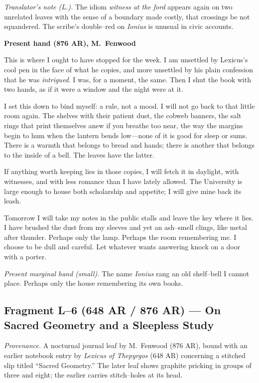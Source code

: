 \documentclass[11pt]{article}
\begin{document}
\medskip
\noindent\textit{Translator’s note (L.).} The idiom \textit{witness at the ford} appears again on two unrelated leaves with the sense of a boundary made costly, that crossings be not squandered. The scribe’s double–red on \emph{Ionius} is unusual in civic accounts.

\medskip
\noindent\textbf{Present hand (876 AR), M.\ Fenwood}

This is where I ought to have stopped for the week. I am unsettled by Lexicus’s cool pen in the face of what he copies, and more unsettled by his plain confession that he was \emph{intrigued}. I was, for a moment, the same. Then I shut the book with two hands, as if it were a window and the night were at it.

I set this down to bind myself: a rule, not a mood. I will not go back to that little room again. The shelves with their patient dust, the cobweb banners, the salt rings that print themselves anew if you breathe too near, the way the margins begin to hum when the lantern bends low—none of it is good for sleep or sums. There is a warmth that belongs to bread and hands; there is another that belongs to the inside of a bell. The leaves have the latter.

If anything worth keeping lies in those copies, I will fetch it in daylight, with witnesses, and with less romance than I have lately allowed. The University is large enough to house both scholarship and appetite; I will give mine back its leash.

Tomorrow I will take my notes in the public stalls and leave the key where it lies. I have brushed the dust from my sleeves and yet an ash–smell clings, like metal after thunder. Perhaps only the lamp. Perhaps the room remembering me. I choose to be dull and careful. Let whatever wants answering knock on a door with a porter.

\medskip
\noindent\textit{Present marginal hand (small).} The name \emph{Ionius} rang an old shelf–bell I cannot place. Perhaps only the house remembering its own books.

\subsection{Fragment L--6 (648 AR / 876 AR) — On Sacred Geometry and a Sleepless Study}
\label{frag:l6}

\noindent\textit{Provenance.} A nocturnal journal leaf by M.\ Fenwood (876 AR), bound with an earlier notebook entry by \textit{Lexicus of Thepyrgos} (648 AR) concerning a stitched slip titled “Sacred Geometry.” The later leaf shows graphite pricking in groups of three and eight; the earlier carries stitch–holes at its head.
\end{document}
